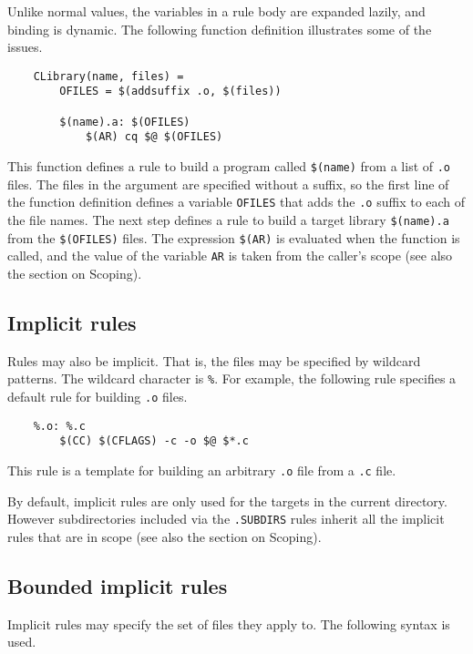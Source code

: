 Unlike normal values, the variables in a rule body are expanded lazily, and binding is dynamic.  The
following function definition illustrates some of the issues.

\begin{verbatim}
    CLibrary(name, files) =
        OFILES = $(addsuffix .o, $(files))

        $(name).a: $(OFILES)
            $(AR) cq $@ $(OFILES)
\end{verbatim}

This function defines a rule to build a program called \verb+$(name)+ from a list of \verb+.o+
files.  The files in the argument are specified without a suffix, so the first line of the function
definition defines a variable \verb+OFILES+ that adds the \verb+.o+ suffix to each of the file
names.  The next step defines a rule to build a target library \verb+$(name).a+ from the
\verb+$(OFILES)+ files. The expression \verb+$(AR)+ is evaluated when the function is called, and
the value of the variable \verb+AR+ is taken from the caller's scope (see also the section on
Scoping).

\subsection{Implicit rules}

Rules may also be implicit.  That is, the files may be specified by wildcard patterns.
The wildcard character is \verb+%+.  For example, the following rule specifies a default
rule for building \verb+.o+ files.

\begin{verbatim}
    %.o: %.c
        $(CC) $(CFLAGS) -c -o $@ $*.c
\end{verbatim}

This rule is a template for building an arbitrary \verb+.o+ file from
a \verb+.c+ file.

By default, implicit rules are only used for the targets in the current
directory. However subdirectories included via the \verb+.SUBDIRS+ rules
inherit all the implicit rules that are in scope (see also the section on
Scoping).

\subsection{Bounded implicit rules}

Implicit rules may specify the set of files they apply to.  The following syntax is used.

